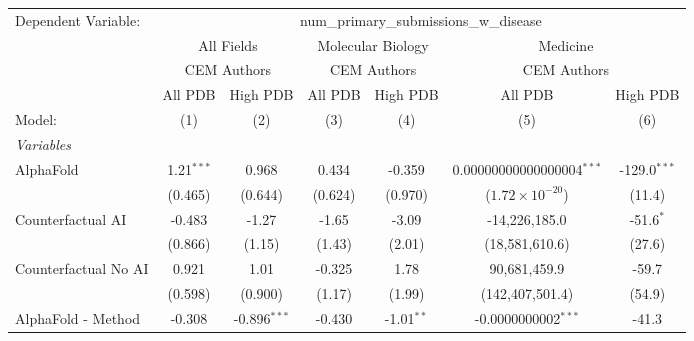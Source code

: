 \begingroup
\centering
\begin{tabular}{lcccccc}
   \tabularnewline \midrule \midrule
   Dependent Variable: & \multicolumn{6}{c}{num\_primary\_submissions\_w\_disease}\\
 & \multicolumn{2}{c}{All Fields} & \multicolumn{2}{c}{Molecular Biology} & \multicolumn{2}{c}{Medicine} \\
\cmidrule(lr){2-3} \cmidrule(lr){4-5} \cmidrule(lr){6-7}
 & \multicolumn{2}{c}{CEM Authors} & \multicolumn{2}{c}{CEM Authors} & \multicolumn{2}{c}{CEM Authors} \\
\cmidrule(lr){2-3} \cmidrule(lr){4-5} \cmidrule(lr){6-7}
 & \multicolumn{1}{c}{All PDB} & \multicolumn{1}{c}{High PDB} & \multicolumn{1}{c}{All PDB} & \multicolumn{1}{c}{High PDB} & \multicolumn{1}{c}{All PDB} & \multicolumn{1}{c}{High PDB} \\
\cmidrule(lr){2-2} \cmidrule(lr){3-3} \cmidrule(lr){4-4} \cmidrule(lr){5-5} \cmidrule(lr){6-6} \cmidrule(lr){7-7}
   Model:                                                     & (1)           & (2)            & (3)     & (4)          & (5)                             & (6)\\  
   \midrule
   \emph{Variables}\\
   AlphaFold                                                  & 1.21$^{***}$  & 0.968          & 0.434   & -0.359       & 0.00000000000000004$^{***}$     & -129.0$^{***}$\\   
                                                              & (0.465)       & (0.644)        & (0.624) & (0.970)      & ($1.72\times 10^{-20}$)         & (11.4)\\   
   Counterfactual AI                                          & -0.483        & -1.27          & -1.65   & -3.09        & -14,226,185.0                   & -51.6$^{*}$\\   
                                                              & (0.866)       & (1.15)         & (1.43)  & (2.01)       & (18,581,610.6)                  & (27.6)\\   
   Counterfactual No AI                                       & 0.921         & 1.01           & -0.325  & 1.78         & 90,681,459.9                    & -59.7\\   
                                                              & (0.598)       & (0.900)        & (1.17)  & (1.99)       & (142,407,501.4)                 & (54.9)\\   
   AlphaFold - Method                                         & -0.308        & -0.896$^{***}$ & -0.430  & -1.01$^{**}$ & -0.0000000002$^{***}$           & -41.3\\   

\end{tabular}
